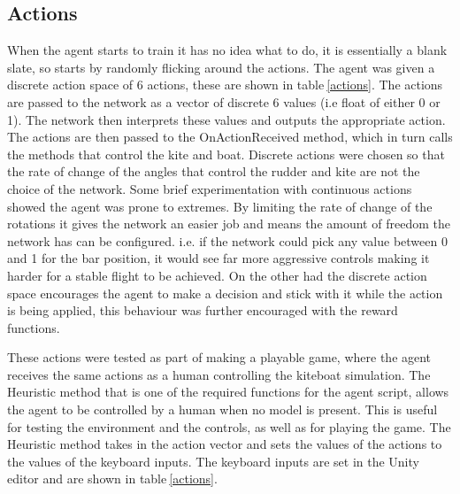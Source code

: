 \subsection{Actions}
When the agent starts to train it has no idea what to do, it is essentially a blank slate, so starts by randomly flicking around the actions. The agent was given a discrete action space of 6 actions, these are shown in table$~$\ref{actions}. The actions are passed to the network as a vector of discrete 6 values (i.e float of either 0 or 1). The network then interprets these values and outputs the appropriate action. The actions are then passed to the OnActionReceived method, which in turn calls the methods that control the kite and boat. Discrete actions were chosen so that the rate of change of the angles that control the rudder and kite are not the choice of the network. Some brief experimentation with continuous actions showed the agent was prone to extremes. By limiting the rate of change of the rotations it gives the network an easier job and means the amount of freedom the network has can be configured. i.e. if the network could pick any value between 0 and 1 for the bar position, it would see far more aggressive controls making it harder for a stable flight to be achieved. On the other had the discrete action space encourages the agent to make a decision and stick with it while the action is being applied, this behaviour was further encouraged with the reward functions. 

These actions were tested as part of making a playable game, where the agent receives the same actions as a human controlling the kiteboat simulation. The Heuristic method that is one of the required functions for the agent script, allows the agent to be controlled by a human when no model is present. This is useful for testing the environment and the controls, as well as for playing the game. The Heuristic method takes in the action vector and sets the values of the actions to the values of the keyboard inputs. The keyboard inputs are set in the Unity editor and are shown in table$~$\ref{actions}. 

\begin{table}[h]
    \centering
    \caption{Actions}\label{actions}
\end{table}


